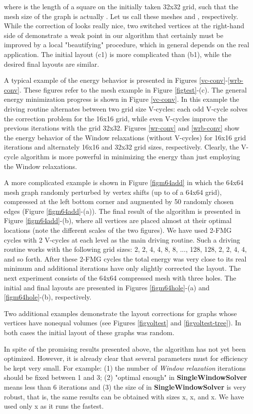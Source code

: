 \documentclass[final]{siamltex}
\begin{document}
where  is the length of a square on the initially taken 32x32
grid, such that the mesh size of the graph is actually . Let
us call these meshes  and , respectively. While the
correction of  looks really nice, two switched vertices at
the right-hand side of  demonstrate a weak point in our
algorithm that certainly must be improved by a local "beautifying"
procedure, which in general depends on the real application. The
initial layout (c1) is more complicated than (b1), while the
desired final layouts are similar.
\par A typical example of the energy behavior is presented
in Figures \ref{vc-conv}-\ref{wrb-conv}. These figures refer to
the mesh example in Figure \ref{figtest}-(c). The general energy
minimization progress is shown in Figure \ref{vc-conv}. In this
example the driving routine alternates between two grid size
V-cycles: each odd V-cycle solves the correction problem for the
16x16 grid, while even V-cycles improve the previous iterations
with the grid 32x32.
Figures \ref{wr-conv} and \ref{wrb-conv} show the
energy behavior of the Window relaxations (without V-cycles) for
16x16 grid iterations and alternately 16x16 and 32x32 grid sizes,
respectively. Clearly, the V-cycle algorithm is more powerful in
minimizing the energy than just employing the Window relaxations.
\par A more complicated example is shown in Figure
\ref{figm64add} in which the 64x64 mesh graph randomly perturbed
by vertex shifts (up to  of a 64x64 grid), compressed at the
left bottom corner and augmented by 50 randomly chosen edges
 (Figure \ref{figm64add}-(a)). The final result of the
 algorithm is presented in Figure  \ref{figm64add}-(b), where
  all vertices are placed almost at their optimal locations (note the different scales of the two figures).
 We have
  used 2-FMG cycles with 2 V-cycles at each level as the main driving routine.
  Such a driving routine works with the following
  grid sizes: 2, 2, 4, 4, 8, 8, ..., 128, 128, 2, 2, 4, 4, and so forth. After these 2-FMG cycles
  the total energy was very close to its real minimum and
  additional iterations have only slightly corrected the layout.  The next experiment consists of the 64x64 compressed
mesh with three holes. The initial and final layouts are
 presented in Figures \ref{figm64hole}-(a) and \ref{figm64hole}-(b), respectively.
\par Two additional examples demonstrate the layout corrections
for graphs whose vertices have nonequal volumes (see Figures \ref{figvoltest}
and \ref{figvoltest-tree}). In both cases the initial layout
of these graphs was random.
\par In spite of the promising results presented above,
the algorithm has not yet been optimized. However, it is already
clear that several parameters must for efficiency be kept very
small. For example: (1) the number of {\it Window relaxation}
iterations should be fixed between 1 and 3; (2) "optimal enough"
in {\bf SingleWindowSolver} means less than 6 iterations and (3)
the size of  in {\bf SingleWindowSolver} is very robust,
that is, the same results can be obtained with sizes x, x,
and x. We have used only x as it runs the fastest.
\end{document}
